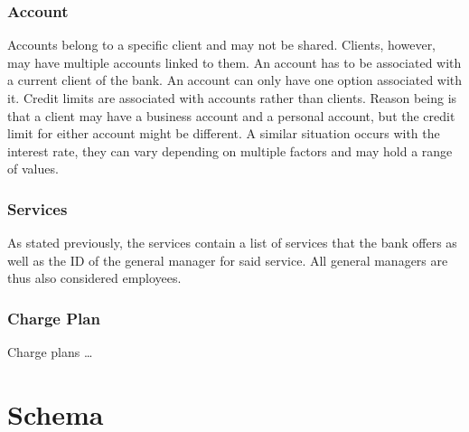 \documentclass[letterpaper, 12pt]{article}
\begin{document}
\subsubsection{Account}
Accounts belong to a specific client and may not be shared.
Clients, however, may have multiple accounts linked to them.
An account has to be associated with a current client of the bank.
An account can only have one option associated with it.%
Credit limits are associated with accounts rather than clients.
Reason being is that a client may have a business account and a personal account, but the credit limit for either account might be different.
A similar situation occurs with the interest rate, they can vary depending on multiple factors and may hold a range of values.


\subsubsection{Services}
As stated previously, the services contain a list of services that the bank offers as well as the ID of the general manager for said service.
All general managers are thus also considered employees.

\subsubsection{Charge Plan}
Charge plans \ldots

\section{Schema}

%  
%
%  
\end{document}
